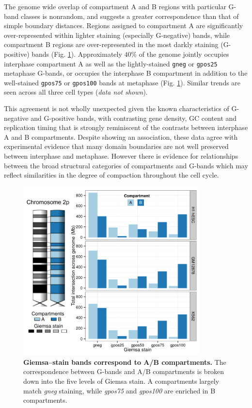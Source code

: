 \documentclass[a4paper,11pt,oneside]{book}
\begin{document}
The genome wide overlap of compartment A and B regions with particular G-band classes is nonrandom, and suggests a greater correspondence than that of simple boundary distances. Regions assigned to compartment A are significantly over-represented within lighter staining (especially G-negative) bands, while compartment B regions are over-represented in the most darkly staining (G-positive) bands (Fig. \ref{fig:gbands}). Approximately $40\%$ of the genome jointly occupies interphase compartment A as well as the lightly-stained \texttt{gneg} or \texttt{gpos25} metaphase G-bands, or occupies the interphase B compartment in addition to the well-stained \texttt{gpos75} or \texttt{gpos100} bands at metaphase (Fig. \ref{fig:gbands}). Similar trends are seen across all three cell types (\emph{data not shown}). 

This agreement is not wholly unexpected given the known characteristics of G-negative and G-positive bands, with contrasting gene density, GC content and replication timing\cite{Furey2003} that is strongly reminiscent of the contrasts between interphase A and B compartments.\cite{Lieberman2009} Despite showing an association, these data agree with experimental evidence that many domain boundaries are not well preserved between interphase and metaphase. However there is evidence for relationships between the broad structural categories of compartments and G-bands which may reflect similarities in the degree of compaction throughout the cell cycle.

\begin{figure}
\begin{center} 
\includegraphics[width=3.8in]{figs/gbands.pdf}
\captionsetup{width=\textwidth}
\caption[ Giemsa--stain bands correspond to A/B compartments.]{ {\bf Giemsa--stain bands correspond to A/B compartments.}
The correspondence between G-bands and A/B compartments is broken down into the five levels of Giemsa stain. A compartments largely match \emph{gneg} staining, while \emph{gpos75} and \emph{gpos100} are enriched in B compartments.
}\label{fig:gbands}
\end{center}
\end{figure} 
\end{document}
